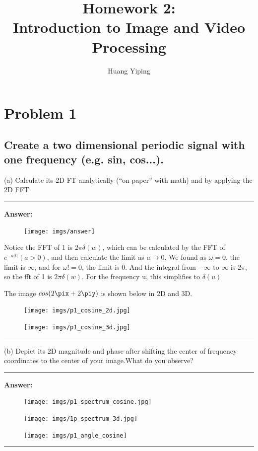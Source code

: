 \documentclass[conference]{styles/acmsiggraph}
\title{\huge Homework 2: \\ \LARGE {Introduction to Image and Video Processing}}
\author{\Large Huang Yiping \\}
\newenvironment{answer}{}{}
\begin{document}
\maketitle


\section{Problem 1}

\subsection{Create a two dimensional periodic signal with one frequency (e.g. sin, cos...).}
(a) Calculate its 2D FT analytically (“on paper” with math) and by applying the 2D FFT

\begin{answer}
	\rule{\textwidth}{0.4pt}
	
	\textbf{Answer:}
	\begin{figure}[H]
	\centering
	\texttt{[image: imgs/answer]}
	\end{figure}	
	Notice the FFT of $1$ is $2\pi\delta(w) $, which can be calculated by the FFT of $e^{-a|t|} (a>0)$, and then calculate the limit as $a\rightarrow0$. We found as $\omega = 0$, the limit is $\infty$, and for $\omega != 0$, the limit is 0. And the integral from $-\infty$ to $\infty$ is $2\pi$, so the fft of 1 is $2\pi\delta(w)$. For the frequency u, this simplifies to $\delta(u)$

	The image $cos(2\pix + 2\piy)$ is shown below in 2D and 3D.
	\begin{figure}[H]
		\centering
		\texttt{[image: imgs/p1\_cosine\_2d.jpg]}
		\end{figure}	
		\begin{figure}[H]
		\centering
		\texttt{[image: imgs/p1\_cosine\_3d.jpg]}
		\end{figure}	

\rule{\textwidth}{0.4pt}
\end{answer}

(b) Depict its 2D magnitude and phase after shifting the center of frequency coordinates to the
center of your image.What do you observe?

\begin{answer}
	\rule{\textwidth}{0.4pt}
	
	\textbf{Answer:}
	\begin{figure}[H]
	\centering
	\texttt{[image: imgs/p1\_spectrum\_cosine.jpg]}
	\end{figure}	
	\begin{figure}[H]
		\centering
		\texttt{[image: imgs/1p\_spectrum\_3d.jpg]}
		\end{figure}	
	\begin{figure}[H]
		\centering
		\texttt{[image: imgs/p1\_angle\_cosine]}
		\end{figure}	

\rule{\textwidth}{0.4pt}
\end{answer}
\end{document}
